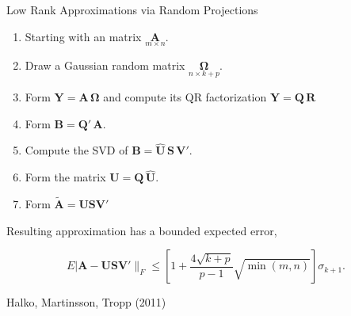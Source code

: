 \documentclass[11pt,ignorenonframetext,]{beamer}
\providecommand{\tightlist}{%
  \setlength{\itemsep}{0pt}\setlength{\parskip}{0pt}}
\begin{document}
\begin{frame}{Low Rank Approximations via Random Projections}
\protect\hypertarget{low-rank-approximations-via-random-projections}{}

\begin{enumerate}
\tightlist
\item
  Starting with an matrix \(\underset{m \times n}{\symbf{A}}\).
\end{enumerate}

\pause

\begin{enumerate}
\setcounter{enumi}{1}
\tightlist
\item
  Draw a Gaussian random matrix
  \(\underset{n \times k+p}{\symbf{\Omega}}\).
\end{enumerate}

\pause

\begin{enumerate}
\setcounter{enumi}{2}
\tightlist
\item
  Form \(\symbf{Y} = \symbf{A}\,\symbf{\Omega}\) and compute its QR
  factorization \(\symbf{Y} = \symbf{Q}\,\symbf{R}\)
\end{enumerate}

\pause

\begin{enumerate}
\setcounter{enumi}{3}
\tightlist
\item
  Form \(\symbf{B}=\symbf{Q}'\,\symbf{A}\).
\end{enumerate}

\pause

\begin{enumerate}
\setcounter{enumi}{4}
\tightlist
\item
  Compute the SVD of
  \(\symbf{B} = \symbf{\hat{U}}\,\symbf{S}\,\symbf{V}'\).
\end{enumerate}

\pause

\begin{enumerate}
\setcounter{enumi}{5}
\tightlist
\item
  Form the matrix \(\symbf{U} = \symbf{Q} \, \symbf{\hat{U}}\).
\end{enumerate}

\pause

\begin{enumerate}
\setcounter{enumi}{6}
\tightlist
\item
  Form \(\symbf{\tilde{A}} = \symbf{U}\symbf{S}\symbf{V}'\)
\end{enumerate}

\vspace{2mm}

Resulting approximation has a bounded expected error,

\[ E| \symbf{A} - \symbf{U}\symbf{S}\symbf{V}'\|_F \leq \left[1 + \frac{4\sqrt{k+p}}{p-1} \sqrt{\min(m,n)} \right] \sigma_{k+1}. \]

\begin{center}
Halko, Martinsson, Tropp (2011)
\end{center}

\end{frame}
\end{document}
